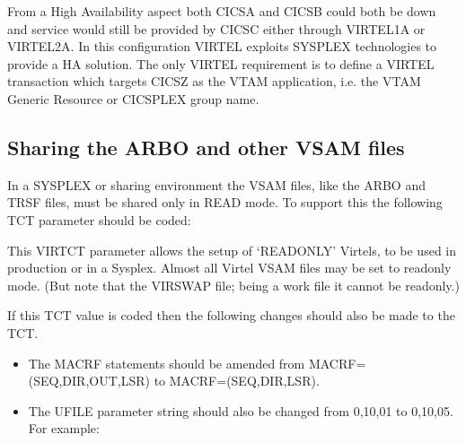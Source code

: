 \documentclass[letterpaper,10pt,english]{sphinxmanual}
\begin{document}
\sphinxAtStartPar
{}

\sphinxAtStartPar
From a High Availability aspect both CICSA and CICSB could both be down and service would still be provided by CICSC either through VIRTEL1A or VIRTEL2A. In this configuration VIRTEL exploits SYSPLEX technologies to provide a HA solution. The only VIRTEL requirement is to define a VIRTEL transaction which targets CICSZ as the VTAM application, i.e. the VTAM
Generic Resource or CICSPLEX group name.


\subsection{Sharing the ARBO and other VSAM files}
\label{\detokenize{connectivity_guide:sharing-the-arbo-and-other-vsam-files}}
\sphinxAtStartPar
In a SYSPLEX or sharing environment the VSAM files, like the ARBO and TRSF files, must be shared only in READ mode. To support this the following TCT parameter should be coded:\sphinxhyphen{}

\begin{sphinxVerbatim}[commandchars=\\\{\}]
\end{sphinxVerbatim}

\sphinxAtStartPar
This VIRTCT parameter allows the setup of ‘READ\sphinxhyphen{}ONLY’ Virtels, to be used in production or in a Sysplex. Almost all Virtel VSAM files may be set to read\sphinxhyphen{}only mode. (But note that the VIRSWAP file; being a work file it cannot be read\sphinxhyphen{}only.)

\sphinxAtStartPar
If this TCT value is coded then the following changes should also be made to the TCT.
\begin{itemize}
\item {} 
\sphinxAtStartPar
The MACRF statements should be amended from MACRF=(SEQ,DIR,OUT,LSR) to MACRF=(SEQ,DIR,LSR).

\item {} 
\sphinxAtStartPar
The UFILE parameter string should also be changed from 0,10,01 to 0,10,05. For example:\sphinxhyphen{}

\end{itemize}

\begin{sphinxVerbatim}[commandchars=\\\{\}]
  
\end{sphinxVerbatim}
\end{document}
